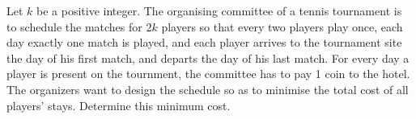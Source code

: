 Let $k$ be a positive integer. The organising committee of a tennis tournament is to schedule the matches for $2k$ players so that every two players play once, each day exactly one match is played, and each player arrives to the tournament site the day of his first match, and departs the day of his last match. For every day a player is present on the tournment, the committee has to pay 1 coin to the hotel. The organizers want to design the schedule so as to minimise the total cost of all players' stays. Determine this minimum cost.